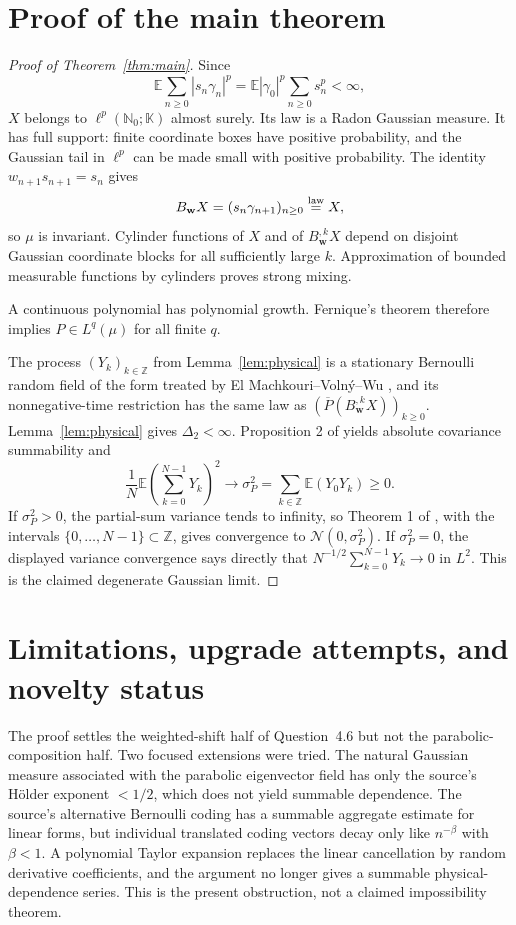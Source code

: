 \documentclass[11pt]{article}
\newcommand{\N}{\mathbb N}
\newcommand{\K}{\mathbb K}
\newcommand{\E}{\mathbb E}
\newcommand{\ellp}{\ell^p(\N_0;\K)}
\begin{document}
\section{Proof of the main theorem}

\begin{proof}[Proof of Theorem~\ref{thm:main}]
Since
\[
 \E\sum_{n\ge0}|s_n\gamma_n|^p
 =\E|\gamma_0|^p\sum_{n\ge0}s_n^p<\infty,
\]
$X$ belongs to $\ellp$ almost surely.  Its law is a Radon Gaussian measure.  It has full support: finite coordinate boxes have positive probability, and the Gaussian tail in $\ell^p$ can be made small with positive probability.  The identity
$w_{n+1}s_{n+1}=s_n$ gives
\[
 B_{\mathbf w}X=(s_n\gamma_{n+1})_{n\ge0}\stackrel{\rm law}=X,
\]
so $\mu$ is invariant.  Cylinder functions of $X$ and of $B_{\mathbf w}^{,k}X$ depend on disjoint Gaussian coordinate blocks for all sufficiently large $k$.  Approximation of bounded measurable functions by cylinders proves strong mixing.

A continuous polynomial has polynomial growth.  Fernique's theorem therefore implies $P\in L^q(\mu)$ for all finite $q$.

The process $(Y_k)_{k\in\mathbb Z}$ from Lemma~\ref{lem:physical} is a stationary Bernoulli random field of the form treated by El Machkouri--Voln\'y--Wu \cite[Definitions 1--2]{EMVW}, and its nonnegative-time restriction has the same law as
$(\overline P(B_{\mathbf w}^{,k}X))_{k\ge0}$.  Lemma~\ref{lem:physical} gives $\Delta_2<\infty$.  Proposition 2 of \cite{EMVW} yields absolute covariance summability and
\[
 \frac1N\E\left(\sum_{k=0}^{N-1}Y_k\right)^2
 \longrightarrow \sigma_P^2
 =\sum_{k\in\mathbb Z}\E(Y_0Y_k)\ge0.
\]
If $\sigma_P^2>0$, the partial-sum variance tends to infinity, so Theorem 1 of \cite{EMVW}, with the intervals $\{0,\ldots,N-1\}\subset\mathbb Z$, gives convergence to $\mathcal N(0,\sigma_P^2)$.  If $\sigma_P^2=0$, the displayed variance convergence says directly that $N^{-1/2}\sum_{k=0}^{N-1}Y_k\to0$ in $L^2$.  This is the claimed degenerate Gaussian limit.
\end{proof}

\section{Limitations, upgrade attempts, and novelty status}

The proof settles the weighted-shift half of Question~4.6 but not the parabolic-composition half.  Two focused extensions were tried.  The natural Gaussian measure associated with the parabolic eigenvector field has only the source's H\"older exponent $<1/2$, which does not yield summable dependence.  The source's alternative Bernoulli coding has a summable aggregate estimate for linear forms, but individual translated coding vectors decay only like $n^{-\beta}$ with $\beta<1$.  A polynomial Taylor expansion replaces the linear cancellation by random derivative coefficients, and the argument no longer gives a summable physical-dependence series.  This is the present obstruction, not a claimed impossibility theorem.
\end{document}
